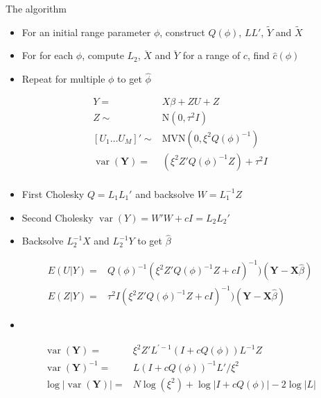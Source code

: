 \documentclass[12pt]{article}
\DeclareMathOperator{\var}{var}
\begin{document}
 


The algorithm
\begin{itemize}
  \item For an initial range parameter $\phi$, construct $Q(\phi)$, $LL'$,
  $\tilde Y$ and $\tilde X$
  \item For for each $\phi$, compute $L_2$, $\breve X$ and $\breve Y$ for a
  range of $c$, find $\hat c(\phi)$
  \item Repeat for multiple $\phi$ to get $\hat \phi$
\end{itemize}


\begin{align*}
Y = & X \beta + Z U + Z\\
Z \sim & \text{N}(0, \tau^2I )\\
[U_1 \ldots U_M]' \sim  & \text{MVN}(0, \xi^2 Q(\phi)^{-1})\\
\var(\mathbf{Y})  = &  ( \xi^2 Z' Q(\phi)^{-1}Z)  + \tau^2 I    \\
\end{align*}

\begin{itemize}
\item First Cholesky  $Q = L_1 L_1'$ and backsolve $W = L_1^{-1}Z$
\item Second Cholesky $\var(Y) = W'W + c I = L_2 L_2'$
\item Backsolve $L_2^{-1}X$ and  $L_2^{-1}Y$ to get $\hat\beta$
\end{itemize}

\begin{align*}
E(U|Y) = &  Q(\phi)^{-1}
(\xi^2 Z' Q(\phi)^{-1}Z + c I)^{-1})
(\mathbf{Y} - \mathbf{X}\hat\beta)\\
E(Z|Y) = & \tau^2 I(\xi^2 Z' Q(\phi)^{-1}Z + c I)^{-1})
(\mathbf{Y} - \mathbf{X}\hat\beta)
\end{align*}

\begin{itemize}
  \item
\end{itemize}
\begin{align*}
\var(\mathbf{Y}) = &  \xi^2  Z ' L^{\prime -1}(  I + c  Q(\phi)  ) L^{-1} Z\\
\var(\mathbf{Y})^{-1} = &    L(  I + c  Q(\phi)  )^{-1} L' / \xi^2\\
\log |\var(\mathbf{Y})| = & N \log(\xi^2) + \log |I + c Q(\phi)| -
2 \log |L|\\
\end{align*}


\end{document}
